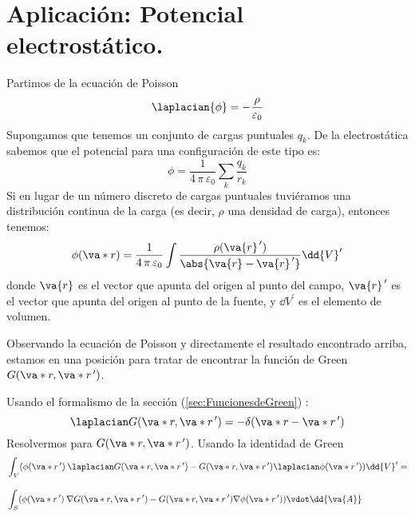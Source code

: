 \section{Aplicación: Potencial electrostático.}
Partimos de la ecuación de Poisson
\begin{equation}
\laplacian{\phi} = - \dfrac{\rho}{\varepsilon_{0}}
\label{eq:ecuacion_31}
\end{equation}
Supongamos que tenemos un conjunto de cargas puntuales $q_{k}$. De la electrostática sabemos que el potencial para una configuración de este tipo es:
\begin{equation}
\phi = \dfrac{1}{4 \, \pi \, \varepsilon_{0}} \sum_{k} \dfrac{q_{k}}{r_{k}}
\label{eq:ecuacion_32}
\end{equation}
Si en lugar de un número discreto de cargas puntuales tuviéramos una distribución continua de la carga (es decir, $\rho$ una densidad de carga), entonces tenemos:
\begin{equation}
\phi(\va*{r}) = \dfrac{1}{4 \, \pi \, \varepsilon_{0}} \int \dfrac{\rho(\va{r}^{\, \prime})}{\abs{\va{r} - \va{r}^{\, \prime}}} \dd{V}^{\prime}
\label{eq:ecuacion_33}
\end{equation}
donde $\va{r}$ es el vector que apunta del origen al punto del campo, $\va{r}^{\, \prime}$ es el vector que apunta del origen al punto de la fuente, y $\dd{V}^{\prime}$ es el elemento de volumen.
\par
Observando la ecuación de Poisson y directamente el resultado encontrado arriba, estamos en una posición para tratar de encontrar la función de Green $G(\va*{r}, \va*{r}^{\, \prime})$. 
\par 
Usando el formalismo de la sección (\ref{sec:FuncionesdeGreen}) :
\begin{equation}
\laplacian G(\va*{r}, \va*{r}^{\, \prime}) = - \delta (\va*{r} - \va*{r}^{\, \prime})
\label{eq:ecuacion_34}
\end{equation}
Resolvermos para $G(\va*{r}, \va*{r}^{\, \prime})$. Usando la identidad de Green
\begin{align}
&\int_{V} (\phi (\va*{r}^{\, \prime}) \: \laplacian G (\va*{r}, \va*{r}^{\, \prime}) - G(\va*{r}, \va*{r}^{\, \prime}) \laplacian \phi (\va*{r}^{\, \prime})) \dd{V}^{\prime} = \label{eq:ecuacion_35} \\[1em]
&\int_{S} (\phi (\va*{r}^{\, \prime}) \: \nabla G (\va*{r}, \va*{r}^{\, \prime}) - G(\va*{r}, \va*{r}^{\, \prime}) \nabla \phi (\va*{r}^{\, \prime})) \vdot \dd{\va{A}} \label{eq:ecuacion_36}
\end{align}
